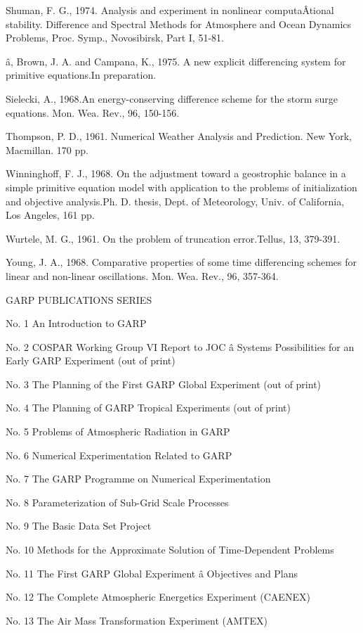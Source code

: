 Shuman, F. G., 1974. Analysis and experiment in nonlinear computaÂ­tional
stability. Difference and Spectral Methods for Atmosphere and Ocean
Dynamics Problems, Proc. Symp., Novosibirsk, Part I, 51-81.

â, Brown, J. A. and Campana, K., 1975. A new explicit differencing
system for primitive equations.In preparation.

Sielecki, A., 1968.An energy-conserving difference scheme for the storm
surge equations. Mon. Wea. Rev., 96, 150-156.

Thompson, P. D., 1961. Numerical Weather Analysis and Prediction. New
York, Macmillan. 170 pp.

Winninghoff, F. J., 1968. On the adjustment toward a geostrophic balance
in a simple primitive equation model with application to the problems of
initialization and objective analysis.Ph. D. thesis, Dept. of
Meteorology, Univ. of California, Los Angeles, 161 pp.

Wurtele, M. G., 1961. On the problem of truncation error.Tellus, 13,
379-391.

Young, J. A., 1968. Comparative properties of some time differencing
schemes for linear and non-linear oscillations. Mon. Wea. Rev., 96,
357-364.

GARP PUBLICATIONS SERIES

No. 1 An Introduction to GARP

No. 2 COSPAR Working Group VI Report to JOC â Systems Possibilities for
an Early GARP Experiment (out of print)

No. 3 The Planning of the First GARP Global Experiment (out of print)

No. 4 The Planning of GARP Tropical Experiments (out of print)

No. 5 Problems of Atmospheric Radiation in GARP

No. 6 Numerical Experimentation Related to GARP

No. 7 The GARP Programme on Numerical Experimentation

No. 8 Parameterization of Sub-Grid Scale Processes

No. 9 The Basic Data Set Project

No. 10 Methods for the Approximate Solution of Time-Dependent Problems

No. 11 The First GARP Global Experiment â Objectives and Plans

No. 12 The Complete Atmospheric Energetics Experiment (CAENEX)

No. 13 The Air Mass Transformation Experiment (AMTEX)

